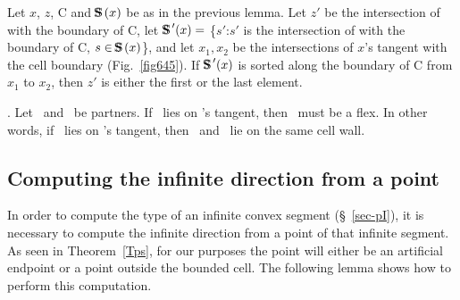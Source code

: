 
\begin{corollary}
\label{cor-645}
Let $x$, $z$, C and $\mbox{S\hspace{-0.68em}S\hspace{.25em}}(x)$ be as in the previous lemma.
Let $z'$ be the intersection of  with the boundary of C,
let $\mbox{S\hspace{-0.68em}S\hspace{.25em}}'(x) =$ \{$s'$:$s'$ is the intersection of  with the 
boundary of C, $s \in \mbox{S\hspace{-0.68em}S\hspace{.25em}}(x)$\},
and let $x_{1},x_{2}$ be the intersections of $x$'s tangent with the cell boundary
{\rm (}Fig.~{\rm\ref{fig645})}.
If $\mbox{S\hspace{-0.68em}S\hspace{.25em}}'(x)$ is sorted along the boundary of C from $x_{1}$ to $x_{2}$,
then $z'$ is either the first or the last element.
\end{corollary}

\vspace{.2in}

\begin{lemma}
\label{Ll}
{\rm \cite[p. 119]{jj}}.
Let \wo\ and \wt\ be partners.
If \wt\ lies on \wo's tangent, then \wo\ must be a flex.
In other words, if \wt\ lies on \wo's tangent, 
then \wo\ and \wt\ lie on the same cell wall.
\end{lemma}

\subsection{Computing the infinite direction from a point}

In order to compute the type of an infinite convex segment (\S~\ref{sec-pI}), 
it is necessary to compute the infinite direction from a point of that infinite segment.
As seen in Theorem~\ref{Tps}, for our purposes the point will either be an artificial
endpoint or a point outside the bounded cell.
The following lemma shows how to perform this computation.

